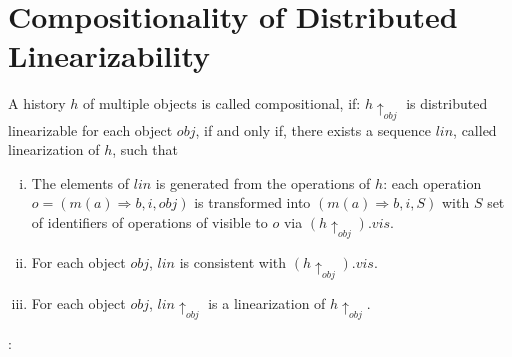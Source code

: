 
\section{Compositionality of Distributed Linearizability}
\label{sec:compositionality of distributed linearizability}


\begin{definition}[Compositionality]
\label{definition:compositionality}
A history $h$ of multiple objects is called compositional, if: $h \uparrow_{\mathit{obj}}$ is distributed linearizable for each object $\mathit{obj}$, if and only if, there exists a sequence $\mathit{lin}$, called linearization of $h$, such that

\begin{enumerate}[(i)]
\item The elements of $\mathit{lin}$ is generated from the operations of $h$: each operation $o = (m(a) \Rightarrow b,i,\mathit{obj})$ is transformed into $(m(a) \Rightarrow b,i,S)$ with $S$ set of identifiers of operations of visible to $o$ via $( h \uparrow_{\mathit{obj}}). \mathit{vis}$.
\item For each object $\mathit{obj}$, $\mathit{lin}$ is consistent with $( h \uparrow_{\mathit{obj}}). \mathit{vis}$.
\item For each object $\mathit{obj}$, $\mathit{lin} \uparrow_{ \mathit{obj} }$ is a linearization of $h \uparrow_{\mathit{obj}}$.
\end{enumerate}
\end{definition}

:

\cite{BurckhardtGYZ14}





